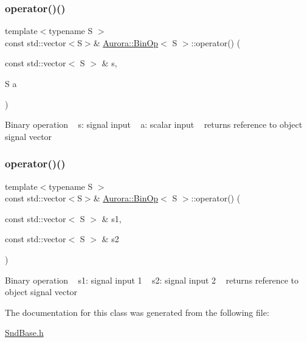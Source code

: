 \subsubsection{\texorpdfstring{operator()()}{operator()()}\hspace{0.1cm}{\footnotesize\ttfamily [2/3]}}
{\footnotesize\ttfamily template$<$typename S $>$ \\
const std\+::vector$<$S$>$\& \hyperlink{class_aurora_1_1_bin_op}{Aurora\+::\+Bin\+Op}$<$ S $>$\+::operator() (\begin{DoxyParamCaption}\item[{const std\+::vector$<$ S $>$ \&}]{s,  }\item[{S}]{a }\end{DoxyParamCaption})\hspace{0.3cm}{\ttfamily [inline]}}

Binary operation ~\newline
s\+: signal input ~\newline
a\+: scalar input ~\newline
returns reference to object signal vector \mbox{\label{class_aurora_1_1_bin_op_abe8a0b7666caeda012d9ac18f889e116}} 
\subsubsection{\texorpdfstring{operator()()}{operator()()}\hspace{0.1cm}{\footnotesize\ttfamily [3/3]}}
{\footnotesize\ttfamily template$<$typename S $>$ \\
const std\+::vector$<$S$>$\& \hyperlink{class_aurora_1_1_bin_op}{Aurora\+::\+Bin\+Op}$<$ S $>$\+::operator() (\begin{DoxyParamCaption}\item[{const std\+::vector$<$ S $>$ \&}]{s1,  }\item[{const std\+::vector$<$ S $>$ \&}]{s2 }\end{DoxyParamCaption})\hspace{0.3cm}{\ttfamily [inline]}}

Binary operation ~\newline
s1\+: signal input 1 ~\newline
s2\+: signal input 2 ~\newline
returns reference to object signal vector 

The documentation for this class was generated from the following file\+:\begin{DoxyCompactItemize}
\item 
\hyperlink{_snd_base_8h}{Snd\+Base.\+h}\end{DoxyCompactItemize}
